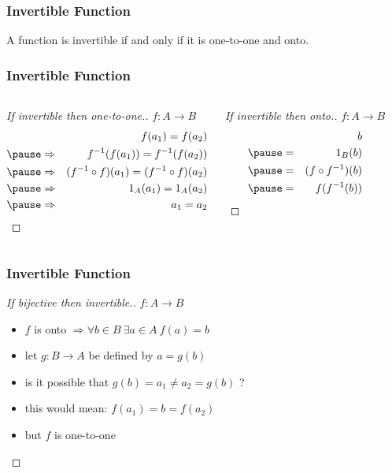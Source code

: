 \documentclass[dvipsnames]{beamer}
\begin{document}
\begin{frame}
  \frametitle{Invertible Function}

  \begin{theorem}
    A function is invertible if and only if it is one-to-one and onto.
  \end{theorem}
\end{frame}

\begin{frame}
  \frametitle{Invertible Function}

  \begin{columns}[t]
    \begin{proof}[If invertible then one-to-one.]
      $f: A \rightarrow B$
      \begin{eqnarray*}
        &             & f(a_1) = f(a_2)\\\pause
        & \Rightarrow & f^{-1}(f(a_1)) = f^{-1}(f(a_2))\\\pause
        & \Rightarrow & (f^{-1} \circ f) (a_1) = (f^{-1} \circ f) (a_2)\\\pause
        & \Rightarrow & 1_A (a_1) = 1_A (a_2)\\\pause
        & \Rightarrow & a_1 = a_2
      \end{eqnarray*}
    \end{proof}

    \pause
    \begin{proof}[If invertible then onto.]
      $f: A \rightarrow B$
      \begin{eqnarray*}
        &   & b\\\pause
        & = & 1_B (b)\\\pause
        & = & (f \circ f^{-1}) (b)\\\pause
        & = & f(f^{-1} (b))
      \end{eqnarray*}
    \end{proof}
  \end{columns}
\end{frame}

\begin{frame}
  \frametitle{Invertible Function}

  \begin{proof}[If bijective then invertible.]
    $f: A \rightarrow B$
    \begin{itemize}
      \item $f$ is onto $\Rightarrow \forall b \in B~\exists a \in A~f(a)=b$
      \item let $g: B \rightarrow A$ be defined by $a=g(b)$

      \pause
      \medskip
      \item is it possible that $g(b) = a_1 \neq a_2 = g(b)$ ?

      \pause
      \item this would mean: $f(a_1) = b = f(a_2)$
      \item but $f$ is one-to-one
    \end{itemize}
  \end{proof}
\end{frame}
\end{document}
